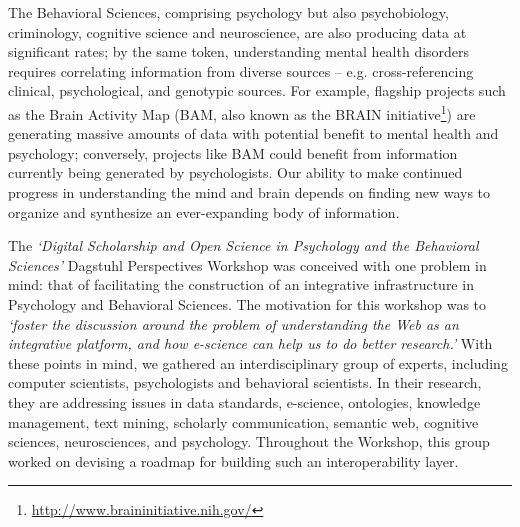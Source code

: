 \documentclass[a4paper,UKenglish]{dagrep}
\begin{document}
The Behavioral Sciences, comprising psychology but also psychobiology,
criminology, cognitive science and neuroscience, are also producing data at
significant rates; by the same token, understanding mental health disorders
requires correlating information from diverse sources – e.g. cross-referencing
clinical, psychological, and genotypic sources. For example, flagship projects
such as the Brain Activity Map (BAM, also known as the BRAIN
initiative\footnote{\url{http://www.braininitiative.nih.gov/}}) are generating
massive amounts of data with potential benefit to mental health and psychology;
conversely, projects like BAM could benefit from information currently being
generated by psychologists. Our ability to make continued progress in
understanding the mind and brain depends on finding new ways to organize and
synthesize an ever-expanding body of information.

The \emph{`Digital Scholarship and Open Science in Psychology and the Behavioral
Sciences'} Dagstuhl Perspectives Workshop was conceived with one problem in
mind: that of facilitating the construction of an integrative infrastructure in
Psychology and Behavioral Sciences. The motivation for this workshop was to
\emph{`foster the discussion around the problem of understanding the Web as an
integrative platform, and how e-science can help us to do better research.'}
With these points in mind, we gathered an interdisciplinary group of experts,
including computer scientists, psychologists and behavioral scientists. In their
research, they are addressing issues in data standards, e-science, ontologies,
knowledge management, text mining, scholarly communication, semantic web,
cognitive sciences, neurosciences, and psychology. Throughout the Workshop, this
group worked on devising a roadmap for building such an interoperability layer. 
\end{document}

